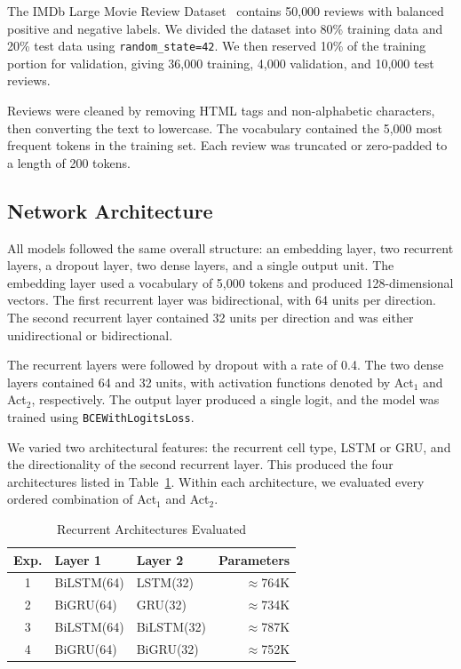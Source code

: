 \documentclass[conference,a4paper]{IEEEtran}
\begin{document}
The IMDb Large Movie Review Dataset~\cite{maas2011}
contains 50{,}000 reviews with balanced positive and negative
labels. We divided the dataset into 80\% training data and
20\% test data using \texttt{random\_state=42}. We then
reserved 10\% of the training portion for validation,
giving 36{,}000 training, 4{,}000 validation, and
10{,}000 test reviews.

Reviews were cleaned by removing HTML tags and
non-alphabetic characters, then converting the text to
lowercase. The vocabulary contained the 5{,}000 most
frequent tokens in the training set. Each review was
truncated or zero-padded to a length of 200 tokens.

\subsection{Network Architecture}

All models followed the same overall structure: an embedding
layer, two recurrent layers, a dropout layer, two dense layers,
and a single output unit. The embedding layer used a vocabulary
of 5{,}000 tokens and produced 128-dimensional vectors.
The first recurrent layer was bidirectional, with 64 units
per direction. The second recurrent layer contained
32 units per direction and was either unidirectional
or bidirectional.

The recurrent layers were followed by dropout with a rate
of 0.4. The two dense layers contained 64 and 32 units,
with activation functions denoted by Act$_1$ and Act$_2$,
respectively. The output layer produced a single logit,
and the model was trained using \texttt{BCEWithLogitsLoss}.

We varied two architectural features: the recurrent cell
type, LSTM or GRU, and the directionality of the second
recurrent layer. This produced the four architectures
listed in Table~\ref{tab:architectures}. Within each
architecture, we evaluated every ordered combination
of Act$_1$ and Act$_2$.

\begin{table}[htbp]
  \caption{Recurrent Architectures Evaluated}
  \label{tab:architectures}
  \centering
  \footnotesize
  \setlength{\tabcolsep}{4pt}
  \renewcommand{\arraystretch}{1.08}
  \begin{tabular}{cllr}
    \toprule
    Exp. & Layer 1 & Layer 2 & Parameters \\
    \midrule
    1 & BiLSTM(64) & LSTM(32)   & ${\approx}$764K \\
    2 & BiGRU(64)  & GRU(32)    & ${\approx}$734K \\
    3 & BiLSTM(64) & BiLSTM(32) & ${\approx}$787K \\
    4 & BiGRU(64)  & BiGRU(32)  & ${\approx}$752K \\
    \bottomrule
  \end{tabular}
\end{table}
\end{document}
